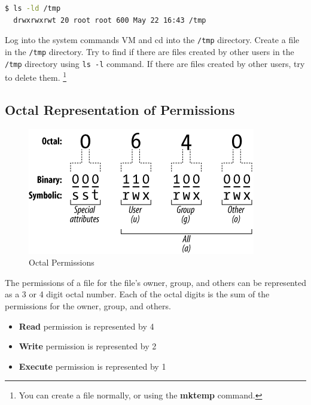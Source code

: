\begin{lstlisting}[language=bash]
  $ ls -ld /tmp
  drwxrwxrwt 20 root root 600 May 22 16:43 /tmp
\end{lstlisting}

\begin{exercise}
  Log into the system commands VM and cd into the \texttt{/tmp} directory.
  Create a file in the \texttt{/tmp} directory.
  Try to find if there are files created by other users in the \texttt{/tmp} directory using \texttt{ls -l} command.
  If there are files created by other users, try to delete them.
  \footnote{
    You can create a file normally, or using the \textbf{mktemp} command.
  }
\end{exercise}

\subsection{Octal Representation of Permissions}

\begin{figure}
  \includegraphics{images/png/octal-permissions.png}
  \caption[Octal Permissions]{Octal Permissions}
\end{figure}

The permissions of a file for the file's owner, group, and others can be represented as a 3 or 4 digit octal number.
Each of the octal digits is the sum of the permissions for the owner, group, and others.

\begin{itemize}
  \item \textbf{Read} permission is represented by 4
  \item \textbf{Write} permission is represented by 2
  \item \textbf{Execute} permission is represented by 1
\end{itemize}

